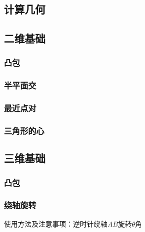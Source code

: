 \documentclass[landscape, oneside, a4paper, cs4size]{book}
\begin{document}
\begin{multicols}{2}
		\chapter{计算几何}
			\section{二维基础}
				\subsection{凸包}
				\begin{spacing}{0.8}
					
				\end{spacing}
				\subsection{半平面交}
				\begin{spacing}{0.8}
					
				\end{spacing}
				\subsection{最近点对}
				\begin{spacing}{0.8}
					
				\end{spacing}
				\subsection{三角形的心}
				\begin{spacing}{0.8}
					
				\end{spacing}
			\section{三维基础}
				\subsection{凸包}
				\begin{spacing}{0.8}
					
				\end{spacing}
				\subsection{绕轴旋转}
				\begin{spacing}{0.8}
					使用方法及注意事项：逆时针绕轴$AB$旋转$\theta$角
					
				\end{spacing}

\end{multicols}
\end{document}
